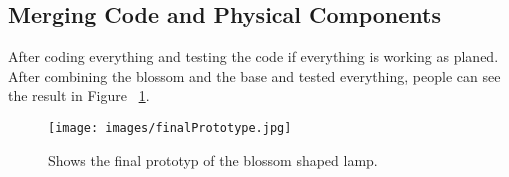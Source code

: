 \documentclass[04_projectProcess.tex]{subfiles}
\begin{document}
    \subsection{Merging Code and Physical Components}
    \begin{flushleft}
        After coding everything and testing the code if everything is working as planed. After 
        combining the blossom and the base and tested everything, people can see the result in 
        Figure ~\ref{fig:finalPrototyp}.

        \begin{figure}[h!]
            \centering
            \texttt{[image: images/finalPrototype.jpg]}
            \caption{Shows the final prototyp of the blossom shaped lamp.}
            \label{fig:finalPrototyp}
        \end{figure}
    \end{flushleft}
\end{document}

